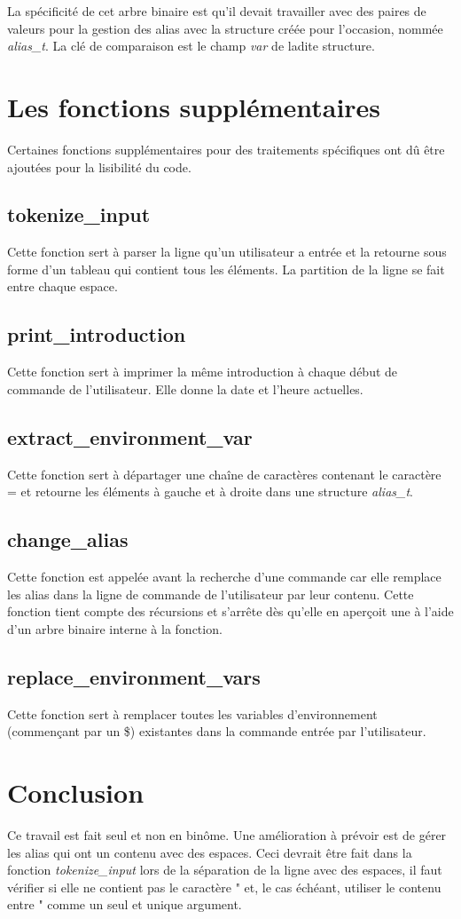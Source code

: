 \documentclass[a4paper,10pt]{article}
\begin{document}
La spécificité de cet arbre binaire est qu'il devait travailler avec des paires de valeurs pour la gestion des alias avec la structure créée pour l'occasion, nommée \emph{alias\_t}. La clé de comparaison est le champ \emph{var} de ladite structure.
\section{Les fonctions supplémentaires}
Certaines fonctions supplémentaires pour des traitements spécifiques ont dû être ajoutées pour la lisibilité du code.
\subsection{tokenize\_input}
Cette fonction sert à parser la ligne qu'un utilisateur a entrée et la retourne sous forme d'un tableau qui contient tous les éléments. La partition de la ligne se fait entre chaque espace.
\subsection{print\_introduction}
Cette fonction sert à imprimer la même introduction à chaque début de commande de l'utilisateur. Elle donne la date et l'heure actuelles.
\subsection{extract\_environment\_var}
Cette fonction sert à départager une chaîne de caractères contenant le caractère = et retourne les éléments à gauche et à droite dans une structure \emph{alias\_t}.
\subsection{change\_alias}
Cette fonction est appelée avant la recherche d'une commande car elle remplace les alias dans la ligne de commande de l'utilisateur par leur contenu. Cette fonction tient compte des récursions et s'arrête dès qu'elle en aperçoit une à l'aide d'un arbre binaire interne à la fonction.
\subsection{replace\_environment\_vars}
Cette fonction sert à remplacer toutes les variables d'environnement (commençant par un \$) existantes dans la commande entrée par l'utilisateur.
\pagebreak
\section{Conclusion}
Ce travail est fait seul et non en binôme.
Une amélioration à prévoir est de gérer les alias qui ont un contenu avec des espaces. Ceci devrait être fait dans la fonction \emph{tokenize\_input} lors de la séparation de la ligne avec des espaces, il faut vérifier si elle ne contient pas le caractère " et, le cas échéant, utiliser le contenu entre " comme un seul et unique argument.


\end{document}
